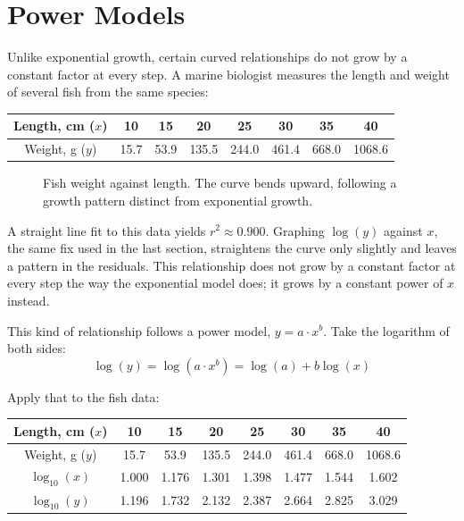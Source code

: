 \section{Power Models}

Unlike exponential growth, certain curved relationships do not grow by a constant factor at every step. A marine biologist measures the length and weight of several fish from the same species:

\begin{table}[H]
\centering
\begin{tabular}{c|ccccccc}
Length, cm ($x$) & 10 & 15 & 20 & 25 & 30 & 35 & 40 \\
\hline
Weight, g ($y$) & 15.7 & 53.9 & 135.5 & 244.0 & 461.4 & 668.0 & 1068.6
\end{tabular}
\end{table}

\begin{figure}[H]
    \centering
    \caption{Fish weight against length. The curve bends upward, following a growth pattern distinct from exponential growth.}
    \label{fig:fishRaw}
\end{figure}

A straight line fit to this data yields $r^2 \approx 0.900$. Graphing $\log(y)$ against $x$, the same fix used in the last section, straightens the curve only slightly and leaves a pattern in the residuals. This relationship does not grow by a constant factor at every step the way the exponential model does; it grows by a constant power of $x$ instead.

This kind of relationship follows a power model, $y = a \cdot x^b$. Take the logarithm of both sides:
\[
\log(y) = \log(a \cdot x^b) = \log(a) + b\log(x)
\]

Apply that to the fish data:

\begin{table}[H]
\centering
\begin{tabular}{c|ccccccc}
Length, cm ($x$) & 10 & 15 & 20 & 25 & 30 & 35 & 40 \\
\hline
Weight, g ($y$) & 15.7 & 53.9 & 135.5 & 244.0 & 461.4 & 668.0 & 1068.6 \\
$\log_{10}(x)$ & 1.000 & 1.176 & 1.301 & 1.398 & 1.477 & 1.544 & 1.602 \\
$\log_{10}(y)$ & 1.196 & 1.732 & 2.132 & 2.387 & 2.664 & 2.825 & 3.029
\end{tabular}
\end{table}

